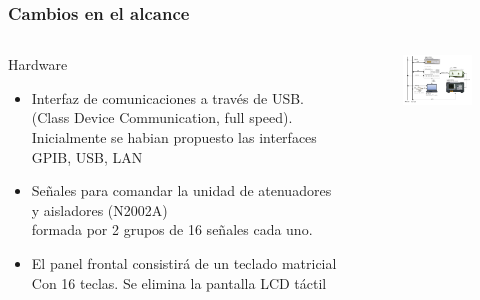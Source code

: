 \documentclass[xcolor=pdftext, table]{beamer}
\begin{document}
	\begin{frame}
		\frametitle{Cambios en el alcance}
		
		\begin{columns}
			\begin{column}{6cm}
				\begin{block}{Hardware}			
					\begin{itemize}				
						\item Interfaz de comunicaciones a través de USB. \\ 
						{\tiny (Class Device Communication, full speed).}
						{\tiny Inicialmente se habian propuesto las interfaces GPIB, USB, LAN}
		
						\item Señales para comandar la unidad de atenuadores y aisladores (N2002A) \\ 
						{\tiny formada por 2 grupos de 16 señales cada uno.}
								
						\item El panel frontal consistirá de un teclado matricial \\ 
						{\tiny Con 16 teclas.} 
						{\tiny Se elimina la pantalla LCD táctil}
					\end{itemize}
				\end{block}	
			\end{column}
			
			\begin{column}{6cm}
				\begin{figure}
					\begin{center}
						\includegraphics[width=6cm]{Imagenes/DiagramaBloquesSistema.pdf}
					\end{center}
				\end{figure}
			\end{column}			
		\end{columns}
		
	\end{frame}
	
\end{document}
